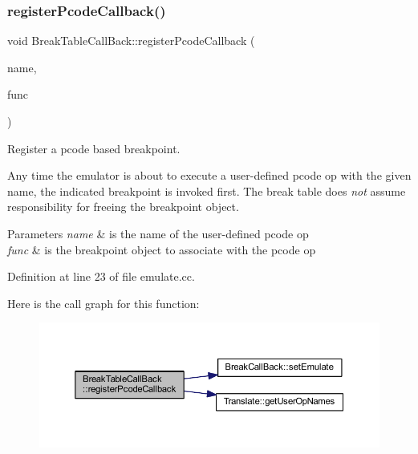\subsubsection{\texorpdfstring{registerPcodeCallback()}{registerPcodeCallback()}}
{\footnotesize\ttfamily void Break\+Table\+Call\+Back\+::register\+Pcode\+Callback (\begin{DoxyParamCaption}\item[{const string \&}]{name,  }\item[{\mbox{\hyperlink{class_break_call_back}{Break\+Call\+Back}} $\ast$}]{func }\end{DoxyParamCaption})}



Register a pcode based breakpoint. 

Any time the emulator is about to execute a user-\/defined pcode op with the given name, the indicated breakpoint is invoked first. The break table does {\itshape not} assume responsibility for freeing the breakpoint object. 
\begin{DoxyParams}{Parameters}
{\em name} & is the name of the user-\/defined pcode op \\
\hline
{\em func} & is the breakpoint object to associate with the pcode op \\
\hline
\end{DoxyParams}


Definition at line 23 of file emulate.\+cc.

Here is the call graph for this function\+:
\nopagebreak
\begin{figure}[H]
\begin{center}
\leavevmode
\includegraphics[width=350pt]{class_break_table_call_back_a7c2ea1b2996ea556188e1c09a8f6ec1f_cgraph}
\end{center}
\end{figure}
\mbox{\label{class_break_table_call_back_a341d8841e68c7237e1502e2643016abc}} 
